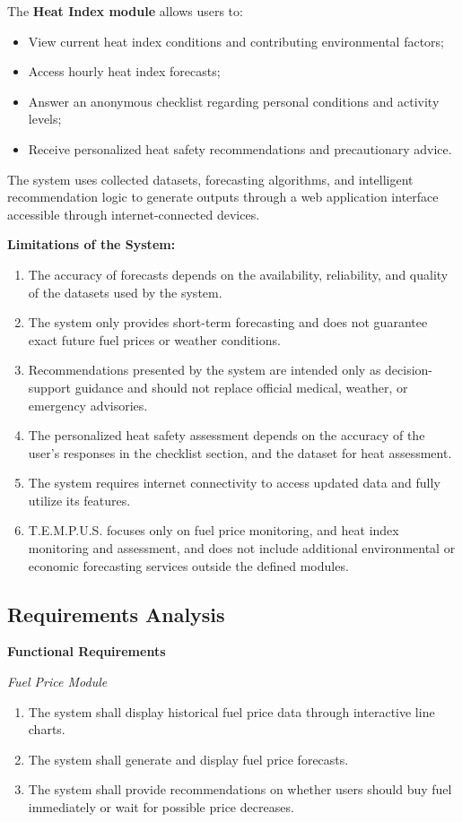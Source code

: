 \documentclass[12pt]{article}
\begin{document}
\noindent The \textbf{Heat Index module} allows users to:
\begin{itemize}
    \item View current heat index conditions and contributing environmental factors;
    \item Access hourly heat index forecasts;
    \item Answer an anonymous checklist regarding personal conditions and activity levels;
    \item Receive personalized heat safety recommendations and precautionary advice.
\end{itemize}

The system uses collected datasets, forecasting algorithms, and intelligent recommendation logic to generate outputs through a web application interface accessible through internet-connected devices.

\medskip
\noindent\textbf{Limitations of the System:}
\begin{enumerate}
    \item The accuracy of forecasts depends on the availability, reliability, and quality of the datasets used by the system.
    \item The system only provides short-term forecasting and does not guarantee exact future fuel prices or weather conditions.
    \item Recommendations presented by the system are intended only as decision-support guidance and should not replace official medical, weather, or emergency advisories.
    \item The personalized heat safety assessment depends on the accuracy of the user's responses in the checklist section, and the dataset for heat assessment.
    \item The system requires internet connectivity to access updated data and fully utilize its features.
    \item T.E.M.P.U.S. focuses only on fuel price monitoring, and heat index monitoring and assessment, and does not include additional environmental or economic forecasting services outside the defined modules.
\end{enumerate}

\subsection{Requirements Analysis}

\noindent\textbf{Functional Requirements}

\medskip
\noindent\textit{Fuel Price Module}
\begin{enumerate}
    \item The system shall display historical fuel price data through interactive line charts.
    \item The system shall generate and display fuel price forecasts.
    \item The system shall provide recommendations on whether users should buy fuel immediately or wait for possible price decreases.
\end{enumerate}
\end{document}
